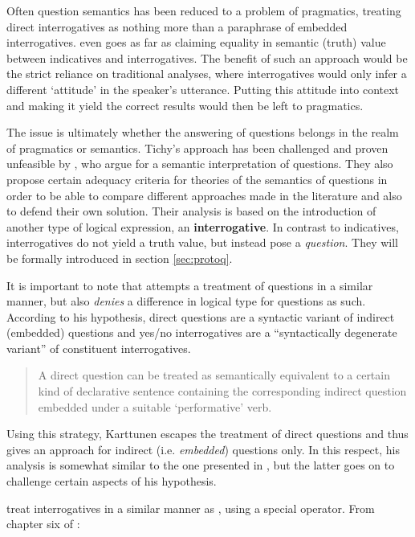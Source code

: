 \documentclass[a4paper]{article}
\newcommand{\term}[1]{\textsf{\textbf{#1}}} %
\newenvironment{quotes}{\begin{quote}\sf}{\rm\end{quote}}
\theoremstyle{remark}
\theoremstyle{remark}
\theoremstyle{definition}
\theoremstyle{definition}
\begin{document}
Often question semantics has been reduced to a problem of
pragmatics, treating direct interrogatives as nothing more than a
paraphrase of embedded interrogatives.\cite{tichy}
even goes as far as claiming equality in semantic (truth) value between
indicatives and interrogatives. The benefit of such an approach would be the
strict reliance on traditional analyses, where interrogatives would only infer a
different `attitude' in the speaker's utterance. Putting this attitude into
context and making it yield the correct results would then be left to
pragmatics.

The issue is ultimately whether the answering of questions belongs in the realm
of pragmatics or semantics. Tichy's approach has been challenged and proven
unfeasible by \cite{gs:q}, who argue for a semantic interpretation of questions.
They also propose certain adequacy criteria for theories of the semantics of
questions in order to be able to compare different approaches made in the
literature and also to defend their own solution. Their analysis is based on the
introduction of another type of logical expression, an \term{interrogative}.
In contrast to indicatives, interrogatives do not yield a truth value, but
instead pose a \emph{question}. They will be formally introduced in section
\ref{sec:protoq}.

It is important to note that \cite{karttunen:1977} attempts a treatment of
questions in a similar manner, but also \emph{denies} a difference in logical
type for questions as such. According to his hypothesis, direct questions are a
syntactic variant of indirect (embedded) questions and yes/no interrogatives are
a ``syntactically degenerate variant'' of constituent interrogatives.

\begin{quotes}A direct question can be treated as semantically equivalent to a
certain kind of declarative sentence containing the corresponding indirect
question embedded under  a suitable `performative' verb.\end{quotes}

Using this strategy, Karttunen escapes the treatment of direct  questions and
thus gives an approach for indirect (i.e. \emph{embedded}) questions  only.
In this respect, his analysis is somewhat similar to the one presented in
\cite{gs:sawhq}, but the latter goes on to challenge certain aspects of his
hypothesis.

\cite{blackburnbos:cl1} treat interrogatives in a similar manner as \cite{gs:q},
using a special operator. From chapter six of \cite{blackburnbos:cl1}:
\end{document}
